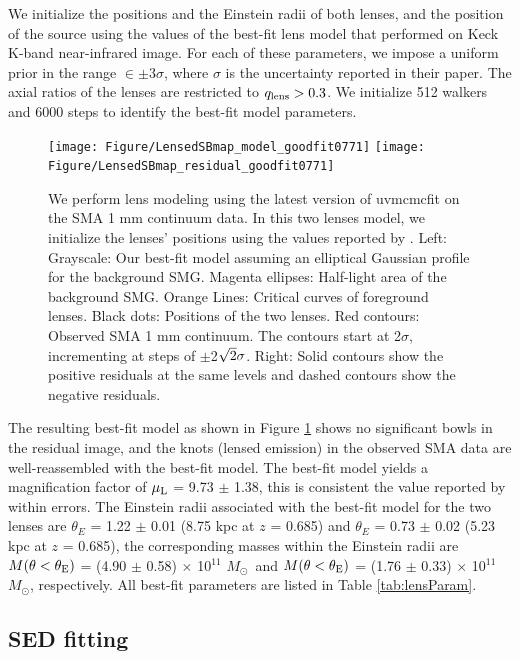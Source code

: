 \documentclass[twocolumn,apj,numberedappendix]{emulateapj}
\newcommand{\Msun}{\mbox{$M_{\odot}$}}
\begin{document}
We initialize the positions and the Einstein radii of both lenses, and the position of the source using the
values of the best-fit lens model that \citet{Haas14} performed on Keck K-band near-infrared image. For each of
these parameters, we impose a uniform prior in the range $\in\pm$3$\sigma$, where $\sigma$ is the uncertainty
reported in their paper. The axial ratios of the lenses are restricted to $q_{\rm lens} > 0.3$. We initialize 512
walkers and 6000 steps to identify the best-fit model parameters.
\begin{figure}[!tbpH]
\centering
\texttt{[image: Figure/LensedSBmap\_model\_goodfit0771]}
\texttt{[image: Figure/LensedSBmap\_residual\_goodfit0771]}
\caption{We perform lens modeling using the latest version of {\sc uvmcmcfit} on the SMA 1 mm continuum data.
In this two lenses model, we initialize the lenses' positions using the values reported by \citet{Haas14}. Left:
Grayscale: Our best-fit model assuming an elliptical Gaussian profile for the background SMG. Magenta ellipses:
Half-light area of the background SMG. Orange Lines: Critical curves of foreground lenses. Black dots: Positions of
the two lenses. Red contours: Observed SMA 1 mm continuum. The contours start at 2$\sigma$, incrementing at
steps of $\pm$2$\sqrt{\rm 2}\sigma$. Right: Solid contours show the positive residuals at the same levels and dashed contours
show the negative residuals. \label{fig:lens}}
\end{figure}

The resulting best-fit model as shown in Figure \ref{fig:lens} shows no significant bowls in the residual
image, and the knots (lensed emission) in the observed SMA data are well-reassembled with the best-fit model.
The best-fit model yields a magnification
factor of $\mu_{\rm L}$ = 9.73 $\pm$ 1.38, this is consistent the value reported by \citet{Haas14} within errors. The Einstein radii associated with the best-fit model for the two lenses are $\theta_{E}$ =
1.22 $\pm$ 0.01 (8.75 kpc at $z$ = 0.685) and $\theta_{E}$ = 0.73 $\pm$ 0.02 (5.23 kpc at $z$ = 0.685),
the corresponding masses within the Einstein radii are $M(\theta < \theta_{\rm E})$ = (4.90 $\pm$ 0.58) $\times$ 10$^{11}$ 
\Msun\ 
and $M(\theta < \theta_{\rm E})$ = (1.76 $\pm$ 0.33) $\times$ 10$^{11}$ \Msun, respectively. All best-fit
parameters are listed in Table \ref{tab:lensParam}.


\subsection{SED fitting} \label{sec:SED}
\end{document}
